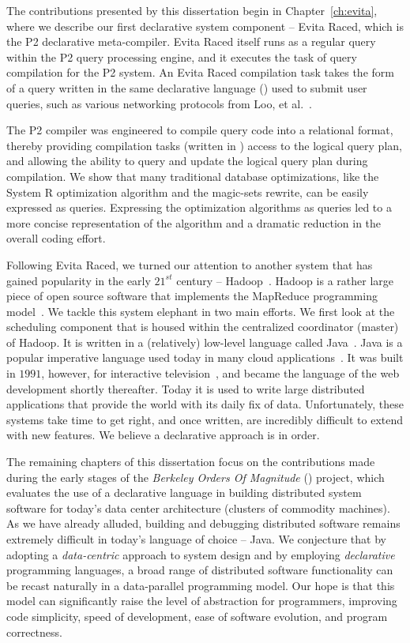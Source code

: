 The contributions presented by this dissertation begin in
Chapter~\ref{ch:evita}, where we describe our first declarative system
component -- Evita Raced, which is the P2 declarative meta-compiler.  Evita
Raced itself runs as a regular query within the P2 query processing engine, and
it executes the task of query compilation for the P2 system.  An Evita Raced
compilation task takes the form of a query written in the same declarative
language (\OVERLOG) used to submit user queries, such as various networking
protocols from Loo, et al.~\cite{loo-sigmod06, p2:sosp}.  

The P2 compiler was engineered to compile query code into a relational format,
thereby providing compilation tasks (written in \OVERLOG) access to the logical
query plan, and allowing the ability to query and update the logical query plan
during compilation.  We show that many traditional database optimizations, like
the System R optimization algorithm and the magic-sets rewrite, can be easily
expressed as \OVERLOG queries.  Expressing the optimization algorithms as
\OVERLOG queries led to a more concise representation of the algorithm and a
dramatic reduction in the overall coding effort.
 
Following Evita Raced, we turned our attention to another system that has
gained popularity in the early $21^{st}$ century -- Hadoop~\cite{hadoop}.
Hadoop is a rather large piece of open source software that implements the
MapReduce programming model~\cite{mapreduce-osdi}.  We tackle this system
elephant in two main efforts.  We first look at the scheduling component that
is housed within the centralized coordinator (master) of Hadoop.  It is written
in a (relatively) low-level language called Java~\cite{java}.  Java is a
popular imperative language used today in many cloud
applications~\cite{pig-sigmod, hive-vldb, zookeeper, hbase, cassandra}.
It was built in $1991$, however, for interactive television~\cite{java-history},
and became the language of the web development shortly thereafter.  Today it is
used to write large distributed applications that provide the world with its
daily fix of data.  Unfortunately, these systems take time to get right, and once
written, are incredibly difficult to extend with new features.  We believe a
declarative approach is in order.

The remaining chapters of this dissertation focus on the contributions made
during the early stages of the {\em Berkeley Orders Of Magnitude} (\BOOM)
project, which evaluates the use of a declarative language in building
distributed system software for today's data center architecture (clusters of
commodity machines).  As we have already alluded, building and debugging
distributed software remains extremely difficult in today's language of choice
-- Java.  We conjecture that by adopting a \emph{data-centric} approach to
system design and by employing \emph{declarative} programming languages, a
broad range of distributed software functionality can be recast naturally in a
data-parallel programming model.  Our hope is that this model can significantly
raise the level of abstraction for programmers, improving code simplicity,
speed of development, ease of software evolution, and program correctness.

